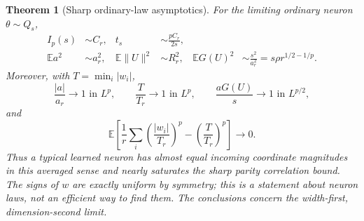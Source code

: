\documentclass[11pt]{article}
\newtheorem{theorem}{Theorem}\newtheorem{lemma}[theorem]{Lemma}
\newcommand{\E}{\mathbb E}\newcommand{\Pp}{\mathbb P}
\begin{document}
\begin{theorem}[Sharp ordinary-law asymptotics]
For the limiting ordinary neuron $\theta\sim Q_s$,
\begin{align*}
 I_p(s)&\sim C_r, &
 t_s&\sim \frac{pC_r}{2s},\\
 \E a^2&\sim a_r^2, &
 \E\|U\|^2&\sim R_r^2, &
 \E G(U)^2&\sim \frac{s^2}{a_r^2}
                       =s\rho r^{1/2-1/p}.
\end{align*}
Moreover, with $T=\min_i|w_i|$,
\[
 \frac{|a|}{a_r}\longrightarrow1\text{ in }L^p,\qquad
 \frac{T}{T_r}\longrightarrow1\text{ in }L^p,\qquad
 \frac{aG(U)}s\longrightarrow1\text{ in }L^{p/2},
\]
and
\[
 \E\left[\frac1r\sum_i\left(\frac{|w_i|}{T_r}\right)^p
                  -\left(\frac T{T_r}\right)^p\right]\to0.
\]
Thus a typical learned neuron has almost equal incoming coordinate
magnitudes in this averaged sense and nearly saturates the sharp parity
correlation bound. The signs of $w$ are exactly uniform by symmetry;
this is a statement about neuron laws, not an efficient way to find them.
The conclusions concern the width-first, dimension-second limit.
\end{theorem}
\end{document}
